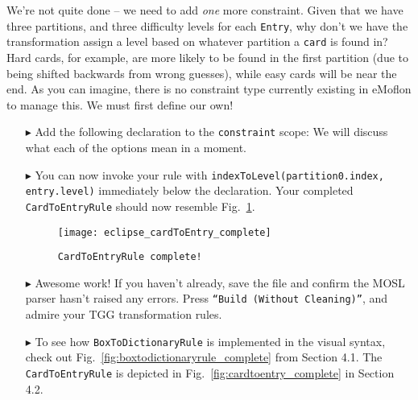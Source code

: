 \newpage

We're not quite done -- we need to add \emph{one} more constraint. Given that we have three partitions, and three difficulty levels for each \texttt{Entry}, why
don't we have the transformation assign a level based on whatever partition a \texttt{card} is found in? Hard cards, for example, are more likely to be found in the first
partition (due to being shifted backwards from wrong guesses), while easy cards will be near the end.  As you can imagine, there is no constraint type currently
existing in eMoflon to manage this. We must first define our own!

\begin{itemize}

\item[$\blacktriangleright$] Add the following declaration to the \texttt{constraint} scope:  We will discuss what
each of the options mean in a moment.

\vspace{0.5cm}

\item[$\blacktriangleright$] You can now invoke your rule with \texttt{indexToLevel(partition0.index, entry.level)} immediately below the declaration. Your
completed \texttt{CardToEntryRule} should now resemble Fig.~\ref{fig:c2eDone}.

\begin{figure}[htbp]
\begin{center}
  \texttt{[image: eclipse\_cardToEntry\_complete]}
  \caption{\texttt{CardToEntryRule complete!}}
  \label{fig:c2eDone}
\end{center}
\end{figure}

\vspace{0.5cm}

\item[$\blacktriangleright$] Awesome work! If you haven't already, save the file and confirm the MOSL parser hasn't raised any errors. Press \texttt{``Build
(Without Cleaning)''}, and admire your TGG transformation rules. 

\vspace{0.5cm}

\item[$\blacktriangleright$] To see how \texttt{BoxToDictionaryRule} is implemented in the visual syntax, check out Fig.~\ref{fig:boxtodictionaryrule_complete}
from Section 4.1. The \texttt{CardToEntryRule} is depicted in Fig.~\ref{fig:cardtoentry_complete} in Section 4.2.

\end{itemize}
